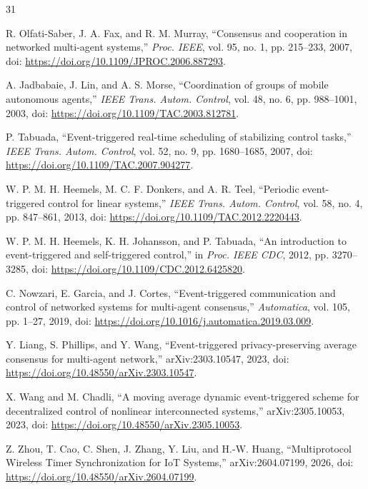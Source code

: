 \documentclass[10pt]{article}
\begin{document}
\begin{thebibliography}{31}
\small
\setlength{\itemsep}{0pt}
\setlength{\parskip}{0pt}

R. Olfati-Saber, J. A. Fax, and R. M. Murray, ``Consensus and cooperation in networked multi-agent systems,'' \emph{Proc. IEEE}, vol. 95, no. 1, pp. 215--233, 2007, doi: \url{https://doi.org/10.1109/JPROC.2006.887293}.

A. Jadbabaie, J. Lin, and A. S. Morse, ``Coordination of groups of mobile autonomous agents,'' \emph{IEEE Trans. Autom. Control}, vol. 48, no. 6, pp. 988--1001, 2003, doi: \url{https://doi.org/10.1109/TAC.2003.812781}.

P. Tabuada, ``Event-triggered real-time scheduling of stabilizing control tasks,'' \emph{IEEE Trans. Autom. Control}, vol. 52, no. 9, pp. 1680--1685, 2007, doi: \url{https://doi.org/10.1109/TAC.2007.904277}.

W. P. M. H. Heemels, M. C. F. Donkers, and A. R. Teel, ``Periodic event-triggered control for linear systems,'' \emph{IEEE Trans. Autom. Control}, vol. 58, no. 4, pp. 847--861, 2013, doi: \url{https://doi.org/10.1109/TAC.2012.2220443}.

W. P. M. H. Heemels, K. H. Johansson, and P. Tabuada, ``An introduction to event-triggered and self-triggered control,'' in \emph{Proc. IEEE CDC}, 2012, pp. 3270--3285, doi: \url{https://doi.org/10.1109/CDC.2012.6425820}.

C. Nowzari, E. Garcia, and J. Cortes, ``Event-triggered communication and control of networked systems for multi-agent consensus,'' \emph{Automatica}, vol. 105, pp. 1--27, 2019, doi: \url{https://doi.org/10.1016/j.automatica.2019.03.009}.

Y. Liang, S. Phillips, and Y. Wang, ``Event-triggered privacy-preserving average consensus for multi-agent network,'' arXiv:2303.10547, 2023, doi: \url{https://doi.org/10.48550/arXiv.2303.10547}.

X. Wang and M. Chadli, ``A moving average dynamic event-triggered scheme for decentralized control of nonlinear interconnected systems,'' arXiv:2305.10053, 2023, doi: \url{https://doi.org/10.48550/arXiv.2305.10053}.

Z. Zhou, T. Cao, C. Shen, J. Zhang, Y. Liu, and H.-W. Huang, ``Multiprotocol Wireless Timer Synchronization for IoT Systems,'' arXiv:2604.07199, 2026, doi: \url{https://doi.org/10.48550/arXiv.2604.07199}.


\end{thebibliography}
\end{document}
